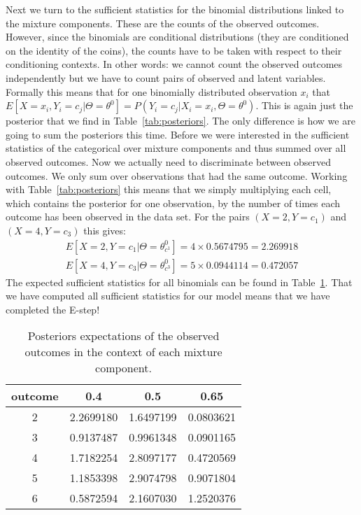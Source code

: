 \documentclass[a4paper,11pt,leqno]{report}\usepackage[]{graphicx}\usepackage[]{color}
\begin{document}
Next we turn to the sufficient statistics for the binomial distributions linked to the mixture components. These are the counts of the observed outcomes. However,
since the binomials are conditional distributions (they are conditioned on the identity of the coins), the counts have to be taken with respect to their conditioning
contexts. In other words: we cannot count the observed outcomes independently but we have to count pairs of observed and latent variables. Formally this means that 
for one binomially distributed observation $ x_{i} $ that $ E[X=x_{i},Y_{i}=c_{j}|\Theta=\theta^{0}] = P(Y_{i}=c_{j}|X_{i}=x_{i}, \Theta=\theta^{0}) $. This is again
just the posterior that we find in Table~\ref{tab:posteriors}. The only difference is how we are going to sum the posteriors this time. Before we were interested
in the sufficient statistics of the categorical over mixture components and thus summed over all observed outcomes. Now we actually need to discriminate between
observed outcomes. We only sum over observations that had the same outcome. Working with Table~\ref{tab:posteriors} this means that we simply multiplying each
cell, which contains the posterior for one observation, by the number of times each outcome has been observed in the data set. For the pairs $ (X=2,Y=c_{1}) $
and $ (X=4,Y = c_{3}) $ this gives:
\begin{align}
E[X=2,Y=c_{1}|\Theta=\theta^{0}_{c^{1}}] = 4 \times 0.5674795 = 2.269918 \\
E[X=4,Y=c_{3}|\Theta=\theta^{0}_{c^{3}}] = 5 \times 0.0944114 = 0.472057
\end{align} 
The expected sufficient statistics for all binomials can be found in Table~\ref{tab:binomPosteriors}. That we have computed all sufficient statistics
for our model means that we have completed the E-step!

\begin{table}
\center

\begin{tabular}{c|c|c|c}
\hline
outcome & 0.4 & 0.5 & 0.65\\
\hline
2 & 2.2699180 & 1.6497199 & 0.0803621\\
\hline
3 & 0.9137487 & 0.9961348 & 0.0901165\\
\hline
4 & 1.7182254 & 2.8097177 & 0.4720569\\
\hline
5 & 1.1853398 & 2.9074798 & 0.9071804\\
\hline
6 & 0.5872594 & 2.1607030 & 1.2520376\\
\hline
\end{tabular}


\caption{Posteriors expectations of the observed outcomes in the context of each mixture component.}
\label{tab:binomPosteriors}
\end{table}
\end{document}
